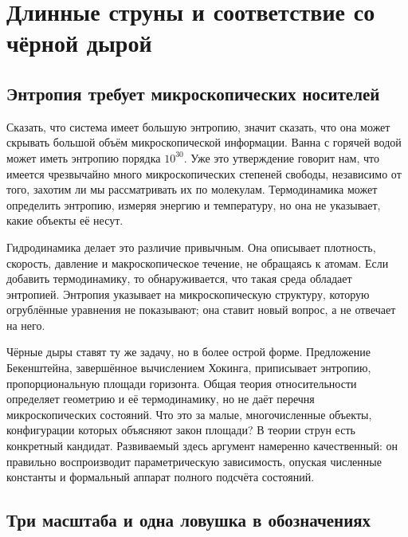 \chapter{Длинные струны и соответствие со чёрной дырой}


\section{Энтропия требует микроскопических носителей}

Сказать, что система имеет большую энтропию, значит сказать, что она может скрывать большой объём микроскопической информации. Ванна с горячей водой может иметь энтропию порядка \(10^{30}\). Уже это утверждение говорит нам, что имеется чрезвычайно много микроскопических степеней свободы, независимо от того, захотим ли мы рассматривать их по молекулам. Термодинамика может определить энтропию, измеряя энергию и температуру, но она не указывает, какие объекты её несут.

Гидродинамика делает это различие привычным. Она описывает плотность, скорость, давление и макроскопическое течение, не обращаясь к атомам. Если добавить термодинамику, то обнаруживается, что такая среда обладает энтропией. Энтропия указывает на микроскопическую структуру, которую огрублённые уравнения не показывают; она ставит новый вопрос, а не отвечает на него.

Чёрные дыры ставят ту же задачу, но в более острой форме. Предложение Бекенштейна, завершённое вычислением Хокинга, приписывает энтропию, пропорциональную площади горизонта. Общая теория относительности определяет геометрию и её термодинамику, но не даёт перечня микроскопических состояний. Что это за малые, многочисленные объекты, конфигурации которых объясняют закон площади? В теории струн есть конкретный кандидат. Развиваемый здесь аргумент намеренно качественный: он правильно воспроизводит параметрическую зависимость, опуская численные константы и формальный аппарат полного подсчёта состояний.

\section{Три масштаба и одна ловушка в обозначениях}

